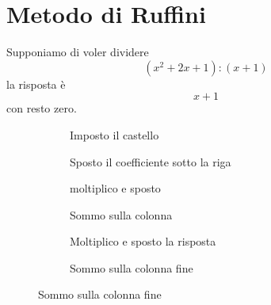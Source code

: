 \section{Metodo di Ruffini}
\begin{esempiot}{}{}
Supponiamo di voler dividere
\[(x^2+2x+1):(x+1)\]
la risposta è \[x+1\] con resto zero.
\end{esempiot}
\begin{figure}
	\begin{subfigure}[b]{0.55\linewidth}
		\centering
		\caption{Imposto il castello}\label{fig:Ruffiniesempio1a}
	\end{subfigure}%
	\captionsetup{skip=0pt}
	\begin{subfigure}[b]{0.55\linewidth}
		\centering\centering
		\caption{Sposto il coefficiente sotto la riga}\label{fig:Ruffiniesempio1b}
	\end{subfigure}
	\begin{subfigure}[b]{.55\linewidth}
		\centering\centering
		\caption{moltiplico e sposto}\label{fig:Ruffiniesempio1c}
	\end{subfigure}%
		\captionsetup{skip=0pt}
	\begin{subfigure}[b]{.55\linewidth}
		\centering\centering
		\caption{Sommo sulla colonna}\label{fig:Ruffiniesempio1d}
	\end{subfigure}
	\begin{subfigure}[b]{.55\linewidth}
			\centering\centering
			\caption{Moltiplico e sposto la risposta}\label{fig:Ruffiniesempio1e}
		\end{subfigure}%
		\captionsetup{skip=0pt}
		\begin{subfigure}[b]{.55\linewidth}
			\centering\centering
			\caption{Sommo sulla colonna fine}\label{fig:Ruffiniesempio1f}
		\end{subfigure}
\label{fig:Ruffiniesempio1}
\end{figure}

